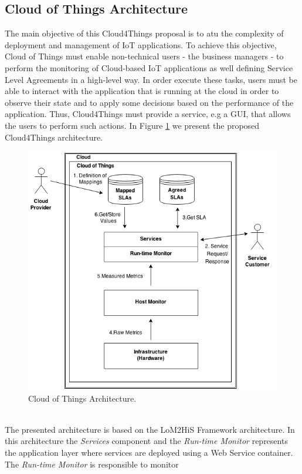 \subsection{Cloud of Things Architecture}
\label{sub:cloud_of_things_architecture}
The main objective of this Cloud4Things proposal is to atu the complexity of deployment and management
of IoT applications. To achieve this objective, Cloud of Things must enable non-technical users - the business
managers - to perform the monitoring of Cloud-based IoT applications as well defining Service Level Agreements
in a high-level way. In order execute these tasks, users must be able to interact with the application that
is running at the cloud in order to observe their state and to apply some decisions based on the performance
of the application. Thus, Cloud4Things must provide a service, e.g a GUI, that allows the users to perform
such actions. In Figure \ref{fig:cloud_of_things_architecture} we present the proposed Cloud4Things architecture.
\vspace{1in}
\begin{figure}[h!]
  \centering
  \includegraphics[width=.8\textwidth]{./images/cloud-of-things-architecture}
  \caption{Cloud of Things Architecture.}
  \label{fig:cloud_of_things_architecture}
\end{figure}\\
The presented architecture is based on the LoM2HiS Framework \cite{emeakaroha2010low} architecture. In this
architecture the \textit{Services} component and the \textit{Run-time Monitor} represents the application layer
where services are deployed using a Web Service container. The \textit{Run-time Monitor} is responsible to monitor
